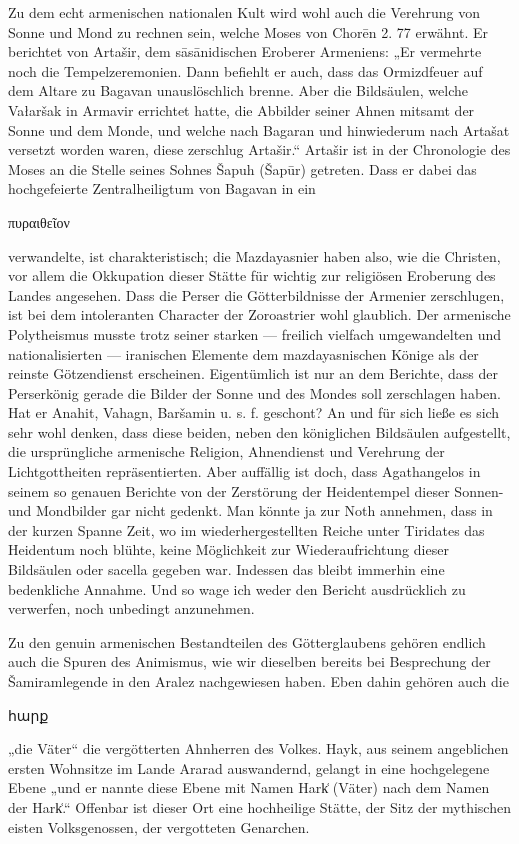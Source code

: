 \documentclass{article}
\begin{document}
Zu dem echt armenischen nationalen Kult wird wohl auch die Verehrung von Sonne und Mond zu rechnen sein, welche Moses von Chorēn 2. 77 erwähnt. Er berichtet von Artašir, dem sāsānidischen Eroberer Armeniens: „Er vermehrte noch die Tempelzeremonien. Dann befiehlt er auch, dass das Ormizdfeuer auf dem Altare zu Bagavan unauslöschlich brenne. Aber die Bildsäulen, welche Vałaršak in Armavir errichtet hatte, die Abbilder seiner Ahnen mitsamt der Sonne und dem Monde, und welche nach Bagaran und hinwiederum nach Artašat versetzt worden waren, diese zerschlug Artašir.“ Artašir ist in der Chronologie des Moses an die Stelle seines Sohnes Šapuh (Šapūr) getreten. Dass er dabei das hochgefeierte Zentralheiligtum von Bagavan in ein \begin{greek}πυραιθεῖον\end{greek} verwandelte, ist charakteristisch; die Mazdayasnier haben also, wie die Christen, vor allem die Okkupation dieser Stätte für wichtig zur religiösen Eroberung des Landes angesehen. Dass die Perser die Götterbildnisse der Armenier zerschlugen, ist bei dem intoleranten Character der Zoroastrier wohl glaublich. Der armenische Polytheismus musste trotz seiner starken — freilich vielfach umgewandelten und nationalisierten — iranischen Elemente dem mazdayasnischen Könige als der reinste Götzendienst erscheinen. Eigentümlich ist nur an dem Berichte, dass der Perserkönig gerade die Bilder der Sonne und des Mondes soll zerschlagen haben. Hat er Anahit, Vahagn, Baršamin u. s. f. geschont? An und für sich ließe es sich sehr wohl denken, dass diese beiden, neben den königlichen Bildsäulen aufgestellt, die ursprüngliche armenische Religion, Ahnendienst und Verehrung der Lichtgottheiten repräsentierten. Aber auffällig ist doch, dass Agathangelos in seinem so genauen Berichte von der Zerstörung der Heidentempel dieser Sonnen- und Mondbilder gar nicht gedenkt. Man könnte ja zur Noth annehmen, dass in der kurzen Spanne Zeit, wo im wiederhergestellten Reiche unter Tiridates das Heidentum noch blühte, keine Möglichkeit zur Wiederaufrichtung dieser Bildsäulen oder sacella gegeben war. Indessen das bleibt immerhin eine bedenkliche Annahme. Und so wage ich weder den Bericht ausdrücklich zu verwerfen, noch unbedingt anzunehmen.

Zu den genuin armenischen Bestandteilen des Götterglaubens gehören endlich auch die Spuren des Animismus, wie wir dieselben bereits bei Besprechung der Šamiramlegende in den Aralez nachgewiesen haben. Eben dahin gehören auch die \begin{armenian}հարք\end{armenian} „die Väter“ die vergötterten Ahnherren des Volkes. Hayk, aus seinem angeblichen ersten Wohnsitze im Lande Ararad auswandernd, gelangt in eine hochgelegene Ebene „und er nannte diese Ebene mit Namen Hark͑ (Väter) nach dem Namen der Hark͑.“ Offenbar ist dieser Ort eine hochheilige Stätte, der Sitz der mythischen eisten Volksgenossen, der vergotteten Genarchen.
\end{document}
